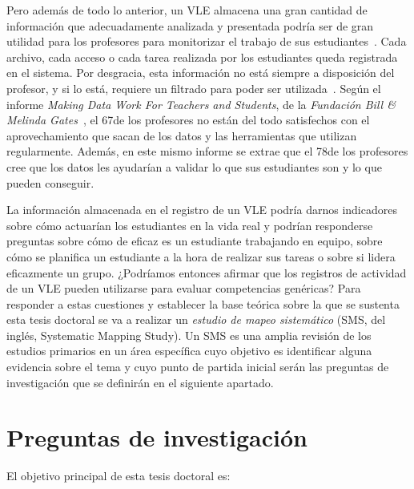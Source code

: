 Pero además de todo lo anterior, un VLE almacena una gran cantidad de información que adecuadamente analizada y presentada podría ser de gran utilidad para los profesores para monitorizar el trabajo de sus estudiantes~\cite{podgorelec:2011}. Cada archivo, cada acceso o cada tarea realizada por los estudiantes queda registrada en el sistema. Por desgracia, esta información no está siempre a disposición del profesor, y si lo está, requiere un filtrado para poder ser utilizada~\cite{Chebil:2012}. Según el informe \emph{Making Data Work For Teachers and Students}, de la \emph{Fundación Bill \& Melinda Gates}~\cite{gates2015making}, el 67\percentage de los profesores no están del todo satisfechos con el aprovechamiento que sacan de los datos y las herramientas que utilizan regularmente. Además, en este mismo informe se extrae que el 78\percentage de los profesores cree que los datos les ayudarían a validar lo que sus estudiantes son y lo que pueden conseguir.   

La información almacenada en el registro de un VLE podría darnos indicadores sobre cómo actuarían los estudiantes en la vida real y podrían responderse preguntas sobre cómo de eficaz es un estudiante trabajando en equipo, sobre cómo se planifica un estudiante a la hora de realizar sus tareas o sobre si lidera eficazmente un grupo. ¿Podríamos entonces afirmar que los registros de actividad de un VLE pueden utilizarse para evaluar competencias genéricas? Para responder a estas cuestiones y establecer la base teórica sobre la que se sustenta esta tesis doctoral se va a realizar un \emph{estudio de mapeo sistemático} (SMS, del inglés, Systematic Mapping Study). Un SMS es una amplia revisión de los estudios primarios en un área específica cuyo objetivo es identificar alguna evidencia sobre el tema y cuyo punto de partida inicial serán las preguntas de investigación que se definirán en el siguiente apartado.

\section{Preguntas de investigación}

El objetivo principal de esta tesis doctoral es:


